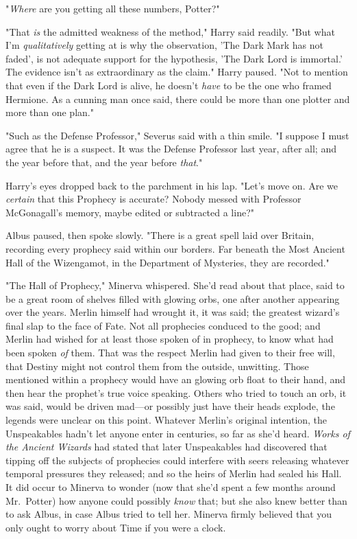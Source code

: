 "\emph{Where} are you getting all these numbers, Potter?"

"That \emph{is} the admitted weakness of the method," Harry said readily. "But what I'm \emph{qualitatively} getting at is why the observation, 'The Dark Mark has not faded', is not adequate support for the hypothesis, 'The Dark Lord is immortal.' The evidence isn't as extraordinary as the claim." Harry paused. "Not to mention that even if the Dark Lord is alive, he doesn't \emph{have} to be the one who framed Hermione. As a cunning man once said, there could be more than one plotter and more than one plan."

"Such as the Defense Professor," Severus said with a thin smile. "I suppose I must agree that he is a suspect. It was the Defense Professor last year, after all; and the year before that, and the year before \emph{that}."

Harry's eyes dropped back to the parchment in his lap. "Let's move on. Are we\emph{ certain} that this Prophecy is accurate? Nobody messed with Professor McGonagall's memory, maybe edited or subtracted a line?"

Albus paused, then spoke slowly. "There is a great spell laid over Britain, recording every prophecy said within our borders. Far beneath the Most Ancient Hall of the Wizengamot, in the Department of Mysteries, they are recorded."

"The Hall of Prophecy," Minerva whispered. She'd read about that place, said to be a great room of shelves filled with glowing orbs, one after another appearing over the years. Merlin himself had wrought it, it was said; the greatest wizard's final slap to the face of Fate. Not all prophecies conduced to the good; and Merlin had wished for at least those spoken of in prophecy, to know what had been spoken \emph{of} them. That was the respect Merlin had given to their free will, that Destiny might not control them from the outside, unwitting. Those mentioned within a prophecy would have an glowing orb float to their hand, and then hear the prophet's true voice speaking. Others who tried to touch an orb, it was said, would be driven mad---or possibly just have their heads explode, the legends were unclear on this point. Whatever Merlin's original intention, the Unspeakables hadn't let anyone enter in centuries, so far as she'd heard. \emph{Works of the Ancient Wizards} had stated that later Unspeakables had discovered that tipping off the subjects of prophecies could interfere with seers releasing whatever temporal pressures they released; and so the heirs of Merlin had sealed his Hall. It did occur to Minerva to wonder (now that she'd spent a few months around Mr.~Potter) how anyone could possibly \emph{know} that; but she also knew better than to ask Albus, in case Albus tried to tell her. Minerva firmly believed that you only ought to worry about Time if you were a clock.

